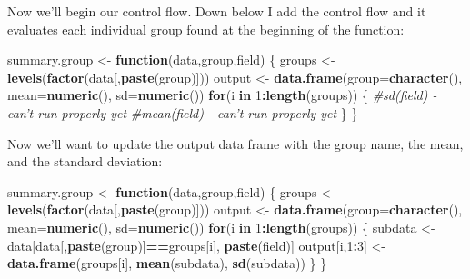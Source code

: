 \documentclass[
]{book}
\newenvironment{Shaded}{\begin{snugshade}}{\end{snugshade}}
\newcommand{\CommentTok}[1]{\textcolor[rgb]{0.56,0.35,0.01}{\textit{#1}}}
\newcommand{\ControlFlowTok}[1]{\textcolor[rgb]{0.13,0.29,0.53}{\textbf{#1}}}
\newcommand{\DataTypeTok}[1]{\textcolor[rgb]{0.13,0.29,0.53}{#1}}
\newcommand{\DecValTok}[1]{\textcolor[rgb]{0.00,0.00,0.81}{#1}}
\newcommand{\KeywordTok}[1]{\textcolor[rgb]{0.13,0.29,0.53}{\textbf{#1}}}
\newcommand{\NormalTok}[1]{#1}
\newcommand{\OperatorTok}[1]{\textcolor[rgb]{0.81,0.36,0.00}{\textbf{#1}}}
\newcommand{\StringTok}[1]{\textcolor[rgb]{0.31,0.60,0.02}{#1}}
\begin{document}
\begin{center}
Now we'll begin our control flow. Down below I add the control flow and it evaluates each individual group found at the beginning of the function:

\begin{Shaded}
\begin{Highlighting}[]
\NormalTok{summary.group <-}\StringTok{ }\ControlFlowTok{function}\NormalTok{(data,group,field) \{}
\NormalTok{  groups <-}\StringTok{ }\KeywordTok{levels}\NormalTok{(}\KeywordTok{factor}\NormalTok{(data[,}\KeywordTok{paste}\NormalTok{(group)]))}
\NormalTok{  output <-}\StringTok{ }\KeywordTok{data.frame}\NormalTok{(}\DataTypeTok{group=}\KeywordTok{character}\NormalTok{(),}
                       \DataTypeTok{mean=}\KeywordTok{numeric}\NormalTok{(),}
                       \DataTypeTok{sd=}\KeywordTok{numeric}\NormalTok{())}
  \ControlFlowTok{for}\NormalTok{(i }\ControlFlowTok{in} \DecValTok{1}\OperatorTok{:}\KeywordTok{length}\NormalTok{(groups)) \{}
    \CommentTok{#sd(field) - can't run properly yet}
    \CommentTok{#mean(field) - can't run properly yet}
\NormalTok{    \}}
\NormalTok{  \}}
\end{Highlighting}
\end{Shaded}

Now we'll want to update the output data frame with the group name, the mean, and the standard deviation:

\begin{Shaded}
\begin{Highlighting}[]
\NormalTok{summary.group <-}\StringTok{ }\ControlFlowTok{function}\NormalTok{(data,group,field) \{}
\NormalTok{  groups <-}\StringTok{ }\KeywordTok{levels}\NormalTok{(}\KeywordTok{factor}\NormalTok{(data[,}\KeywordTok{paste}\NormalTok{(group)]))}
\NormalTok{  output <-}\StringTok{ }\KeywordTok{data.frame}\NormalTok{(}\DataTypeTok{group=}\KeywordTok{character}\NormalTok{(),}
                       \DataTypeTok{mean=}\KeywordTok{numeric}\NormalTok{(),}
                       \DataTypeTok{sd=}\KeywordTok{numeric}\NormalTok{())}
  \ControlFlowTok{for}\NormalTok{(i }\ControlFlowTok{in} \DecValTok{1}\OperatorTok{:}\KeywordTok{length}\NormalTok{(groups)) \{}
\NormalTok{    subdata <-}\StringTok{ }\NormalTok{data[data[,}\KeywordTok{paste}\NormalTok{(group)]}\OperatorTok{==}\NormalTok{groups[i],}
                    \KeywordTok{paste}\NormalTok{(field)]}
\NormalTok{    output[i,}\DecValTok{1}\OperatorTok{:}\DecValTok{3}\NormalTok{] <-}\StringTok{ }\KeywordTok{data.frame}\NormalTok{(groups[i],}
                                \KeywordTok{mean}\NormalTok{(subdata),}
                                \KeywordTok{sd}\NormalTok{(subdata))}
\NormalTok{    \}}
\NormalTok{  \}}
\end{Highlighting}
\end{Shaded}


\end{center}
\end{document}
